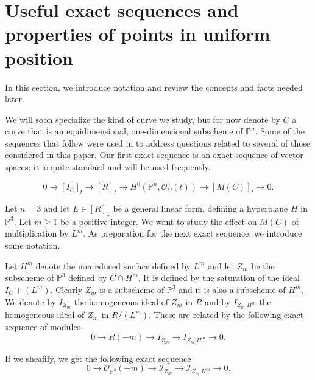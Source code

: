 \documentclass[12pt]{amsart}%
\numberwithin{equation}{section}
\theoremstyle{definition}
\numberwithin{equation}{section}
\newcommand{\PP}{ \ensuremath{\mathbb{P}}}
\begin{document}

\section{Useful exact sequences and properties of points in uniform position}
\label{sec:prelim}

In this section, we introduce notation and review the concepts and facts needed later. 

We will soon specialize the kind of curve we study, but for now denote by $C$ a curve that is an equidimensional, one-dimensional subscheme of $\PP^n$. Some of the sequences that follow were used in \cite{GeomInv} to address questions related to several of those considered in this paper. Our first exact sequence is an exact sequence of vector spaces; it is quite standard and will be used frequently.

\begin{equation} \label{usual 1}
0 \rightarrow [I_C]_t \rightarrow [R]_t \rightarrow H^0(\mathbb P^n, \mathcal O_C(t)) \rightarrow [M(C)]_t \rightarrow 0.
\end{equation}

Let $n=3$ and let $L \in [R]_1$ be a general linear form, defining a hyperplane $H$ in $\PP^3$. Let $m \geq 1$ be a positive integer. We want to study the effect on $M(C)$ of multiplication by $L^m$. As preparation for the next exact sequence, we introduce some notation.

Let $H^m$ denote the nonreduced surface defined by $L^m$ and let $Z_m$ be the subscheme of $\PP^3$ defined by $C \cap H^m$. It is defined by the saturation of the ideal $I_C + (L^m)$. Clearly $Z_m$ is a subscheme of $\PP^3$ and it is also a subscheme of $H^m$. We denote by $I_{Z_m}$ the homogeneous ideal of $Z_m$ in $R$ and by $I_{Z_m | H^m}$ the homogeneous ideal of $Z_m$ in $R/(L^m)$. These are related by the following exact sequence of modules
\begin{equation} \label{usual 2}
    0 \rightarrow R(-m) \rightarrow I_{Z_m} \rightarrow I_{Z_m | H^m} \rightarrow 0.
\end{equation}

If we sheafify, we get the following exact sequence
\begin{equation}
    0 \rightarrow \mathcal O_{\mathbb P^3}(-m) \rightarrow \mathcal I_{Z_m} \rightarrow \mathcal I_{Z_m| H^m} \rightarrow 0.
\end{equation}
\end{document}

